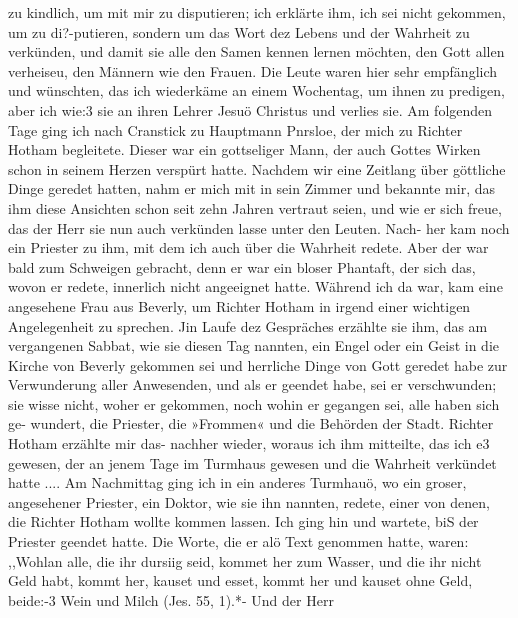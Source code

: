 zu kindlich, um mit mir zu disputieren; ich erklärte ihm, ich sei
nicht gekommen, um zu di?-putieren, sondern um das Wort dez
Lebens und der Wahrheit zu verkünden, und damit sie alle den
Samen kennen lernen möchten, den Gott allen verheiseu, den
Männern wie den Frauen. Die Leute waren hier sehr empfänglich
und wünschten, das ich wiederkäme an einem Wochentag, um
ihnen zu predigen, aber ich wie:3 sie an ihren Lehrer Jesuö
Christus und verlies sie. Am folgenden Tage ging ich nach
Cranstick zu Hauptmann Pnrsloe, der mich zu Richter Hotham
begleitete. Dieser war ein gottseliger Mann, der auch Gottes
Wirken schon in seinem Herzen verspürt hatte. Nachdem wir eine
Zeitlang über göttliche Dinge geredet hatten, nahm er mich mit
in sein Zimmer und bekannte mir, das ihm diese Ansichten
schon seit zehn Jahren vertraut seien, und wie er sich freue, das
der Herr sie nun auch verkünden lasse unter den Leuten. Nach-
her kam noch ein Priester zu ihm, mit dem ich auch über die
Wahrheit redete. Aber der war bald zum Schweigen gebracht,
denn er war ein bloser Phantaft, der sich das, wovon er redete,
innerlich nicht angeeignet hatte.
Während ich da war, kam eine angesehene Frau aus Beverly,
um Richter Hotham in irgend einer wichtigen Angelegenheit zu
sprechen. Jin Laufe dez Gespräches erzählte sie ihm, das am
vergangenen Sabbat, wie sie diesen Tag nannten, ein Engel oder
ein Geist in die Kirche von Beverly gekommen sei und herrliche
Dinge von Gott geredet habe zur Verwunderung aller Anwesenden,
und als er geendet habe, sei er verschwunden; sie wisse nicht, woher
er gekommen, noch wohin er gegangen sei, alle haben sich ge-
wundert, die Priester, die »Frommen« und die Behörden der Stadt.
Richter Hotham erzählte mir das- nachher wieder, woraus ich ihm
mitteilte, das ich e3 gewesen, der an jenem Tage im Turmhaus
gewesen und die Wahrheit verkündet hatte ....
Am Nachmittag ging ich in ein anderes Turmhauö, wo ein
groser, angesehener Priester, ein Doktor, wie sie ihn nannten,
redete, einer von denen, die Richter Hotham wollte kommen lassen.
Ich ging hin und wartete, biS der Priester geendet hatte. Die
Worte, die er alö Text genommen hatte, waren: ,,Wohlan alle,
die ihr dursiig seid, kommet her zum Wasser, und die ihr nicht
Geld habt, kommt her, kauset und esset, kommt her und kauset
ohne Geld, beide:-3 Wein und Milch (Jes. 55, 1).*- Und der Herr


